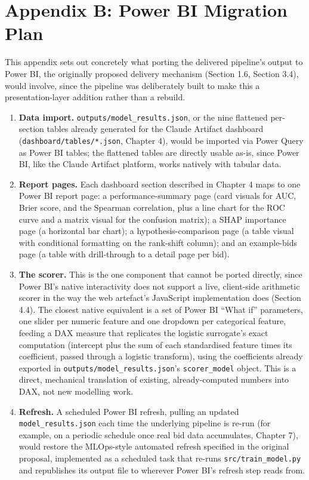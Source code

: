 \documentclass[12pt,oneside]{report}
\providecommand{\tightlist}{%
  \setlength{\itemsep}{0pt}\setlength{\parskip}{0pt}}
\begin{document}
\hypertarget{appendix-b-power-bi-migration-plan}{%
\section*{Appendix B: Power BI Migration
Plan}\label{appendix-b-power-bi-migration-plan}}

This appendix sets out concretely what porting the delivered pipeline's
output to Power BI, the originally proposed delivery mechanism (Section
1.6, Section 3.4), would involve, since the pipeline was deliberately
built to make this a presentation-layer addition rather than a rebuild.

\begin{enumerate}
\def\labelenumi{\arabic{enumi}.}
\tightlist
\item
  \textbf{Data import.} \texttt{outputs/model\_results.json}, or the
  nine flattened per-section tables already generated for the Claude
  Artifact dashboard (\texttt{dashboard/tables/*.json}, Chapter 4),
  would be imported via Power Query as Power BI tables; the flattened
  tables are directly usable as-is, since Power BI, like the Claude
  Artifact platform, works natively with tabular data.
\item
  \textbf{Report pages.} Each dashboard section described in Chapter 4
  maps to one Power BI report page: a performance-summary page (card
  visuals for AUC, Brier score, and the Spearman correlation, plus a
  line chart for the ROC curve and a matrix visual for the confusion
  matrix); a SHAP importance page (a horizontal bar chart); a
  hypothesis-comparison page (a table visual with conditional formatting
  on the rank-shift column); and an example-bids page (a table with
  drill-through to a detail page per bid).
\item
  \textbf{The scorer.} This is the one component that cannot be ported
  directly, since Power BI's native interactivity does not support a
  live, client-side arithmetic scorer in the way the web artefact's
  JavaScript implementation does (Section 4.4). The closest native
  equivalent is a set of Power BI ``What if'' parameters, one slider per
  numeric feature and one dropdown per categorical feature, feeding a
  DAX measure that replicates the logistic surrogate's exact computation
  (intercept plus the sum of each standardised feature times its
  coefficient, passed through a logistic transform), using the
  coefficients already exported in
  \texttt{outputs/model\_results.json}'s \texttt{scorer\_model} object.
  This is a direct, mechanical translation of existing, already-computed
  numbers into DAX, not new modelling work.
\item
  \textbf{Refresh.} A scheduled Power BI refresh, pulling an updated
  \texttt{model\_results.json} each time the underlying pipeline is
  re-run (for example, on a periodic schedule once real bid data
  accumulates, Chapter 7), would restore the MLOps-style automated
  refresh specified in the original proposal, implemented as a scheduled
  task that re-runs \texttt{src/train\_model.py} and republishes its
  output file to wherever Power BI's refresh step reads from.
\end{enumerate}
\end{document}
